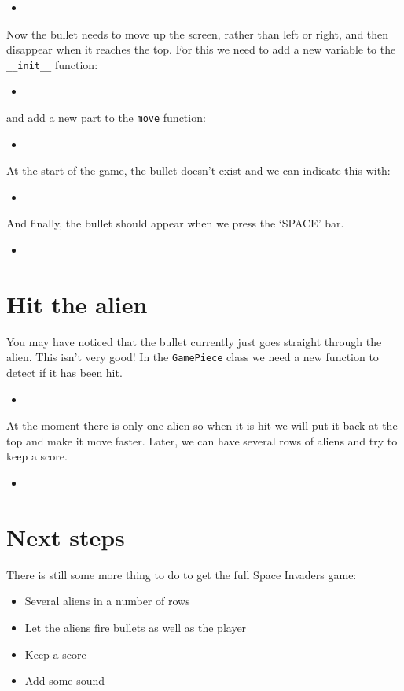 \documentclass[12pt]{article}
\newcommand{\pythonscript}[2]{
\needspace{.125\textheight}
\begin{itemize}
\item[]
\end{itemize}
}
\begin{document}
\pythonscript{loadbullet}{Load the bullet image}

Now the bullet needs to move up the screen, rather than left or right, and
then disappear when it reaches the top. For this we need to add a new
variable to the \texttt{\_\_init\_\_} function:

\pythonscript{bulletinit}{New variables}

and add a new part to the \texttt{move} function:

\pythonscript{bulletmove}{New move function}

At the start of the game, the bullet doesn't exist and we can indicate this
with:

\pythonscript{initialisebullet}{Initialise bullet}

And finally, the bullet should appear when we press the `SPACE' bar.

\pythonscript{fire}{Fire!}

\section{Hit the alien}

You may have noticed that the bullet currently just goes straight through the
alien. This isn't very good! In the \texttt{GamePiece} class we need a new
function to detect if it has been hit.

\pythonscript{detecthit}{Detect a hit}

At the moment there is only one alien so when it is hit we will put it back
at the top and make it move faster. Later, we can have several rows of aliens
and try to keep a score.

\pythonscript{hitalien}{Hit the alien}

\section{Next steps}

There is still some more thing to do to get the full Space Invaders game:

\begin{itemize}
  \item Several aliens in a number of rows
  \item Let the aliens fire bullets as well as the player
  \item Keep a score
  \item Add some sound
\end{itemize}
\end{document}
